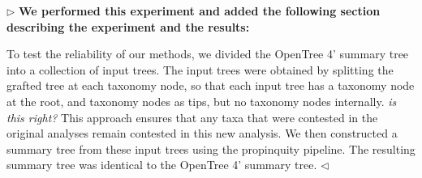 \documentclass{article}
\newenvironment{reply}{$\triangleright$\bf}{$\triangleleft$}
\renewenvironment{quote}
               {\list{}{\rightmargin\leftmargin}%
                \item\relax\normalfont}
               {\endlist}
\begin{document}
\begin{reply}
  We performed this experiment and added the following section describing the experiment and the results:
  \begin{quote}
    To test the reliability of our methods, we divided the OpenTree 4' summary tree into a collection of input trees. The input trees were obtained by splitting the grafted tree at each taxonomy node, so that each input tree has a taxonomy node at the root, and taxonomy nodes as tips, but no taxonomy nodes internally. \emph{is this right?}  This approach ensures that any taxa that were contested in the original analyses remain contested in this new analysis.  We then constructed a summary tree from these input trees using the propinquity pipeline.  The resulting summary tree was identical to the OpenTree 4' summary tree.
  \end{quote}
\end{reply}
\end{document}
